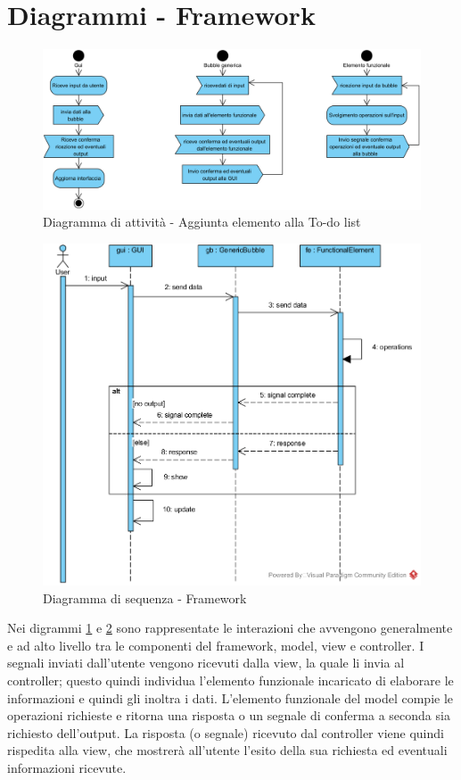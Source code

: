 \section{Diagrammi - Framework}

\begin{figure}[H]
	\centering
	\includegraphics[width=14cm]{diagrammi_img/attivita/framework.png}
	\caption{Diagramma di attività - Aggiunta elemento alla To-do list}
	\label{fig:alt_framework}
\end{figure}

\begin{figure}[H]
	\centering
	\includegraphics[width=14cm]{diagrammi_img/sequenza/framework.png}
	\caption{Diagramma di sequenza - Framework}
	\label{fig:seq_framework}
\end{figure}

Nei digrammi \ref{fig:alt_framework} e \ref{fig:seq_framework} sono rappresentate le interazioni che avvengono generalmente e ad alto
livello tra le componenti del framework, model, view e controller. I segnali inviati dall’utente
vengono ricevuti dalla view, la quale li invia al controller; questo quindi individua l’elemento
funzionale incaricato di elaborare le informazioni e quindi gli inoltra i dati. L’elemento funzionale
del model compie le operazioni richieste e ritorna una risposta o un segnale di conferma a seconda
sia richiesto dell’output. La risposta (o segnale) ricevuto dal controller viene quindi rispedita
alla view, che mostrerà all’utente l’esito della sua richiesta ed eventuali informazioni ricevute.
